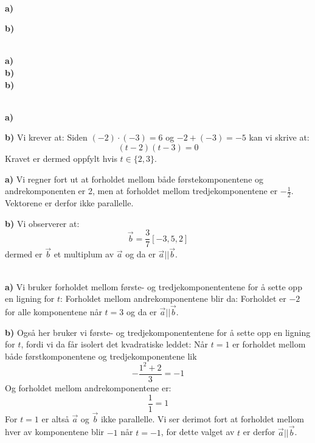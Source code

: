  \\
\textbf{a)} \se{}

\textbf{b)} 

 \\
\textbf{a)} \\
\textbf{b)}  \\
\textbf{b)} 

\\
\textbf{a)} 

\textbf{b)} Vi krever at:
Siden $ (-2)\cdot(-3) = 6 $ og $ -2+(-3)=-5 $ kan vi skrive at:
\[ (t-2)(t-3)=0 \]
Kravet er dermed oppfylt hvis $ t\in\lbrace2, 3\rbrace $. 

\textbf{a)} Vi regner fort ut at forholdet mellom både førstekomponentene og andrekomponenten er 2, men at forholdet mellom tredjekomponentene er $ -\frac{1}{2} $. Vektorene er derfor ikke parallelle.

\textbf{b)} Vi observerer at:
\[ \vec{b}=\frac{3}{7}[-3, 5, 2] \]
dermed er $ \vec{b} $ et multiplum av $ \vec{a} $ og da er $ \vec{a}||\vec{b} $.

\\
\textbf{a)} Vi bruker forholdet mellom første- og tredjekomponententene for å sette opp en ligning for $ t $:
Forholdet mellom andrekomponentene blir da:
Forholdet er $ -2 $ for alle komponentene når $ t=3 $ og da er $ \vec{a}||\vec{b} $.

\textbf{b)} Også her bruker vi første- og tredjekomponententene for å sette opp en ligning for $ t $, fordi vi da får isolert det kvadratiske leddet:
Når $ t=1 $ er forholdet mellom både førstkomponentene og tredjekomponentene lik
\[ -\frac{1^2+2}{3}=-1 \]
Og forholdet mellom andrekomponentene er:
\[ \frac{1}{1}=1 \]
For $ t=1 $ er altså $ \vec{a} $ og $ \vec{b} $ ikke parallelle. Vi ser derimot fort at forholdet mellom hver av komponentene blir $ -1 $ når $ t=-1 $, for dette valget av $ t $ er derfor $ \vec{a}||\vec{b} $.

